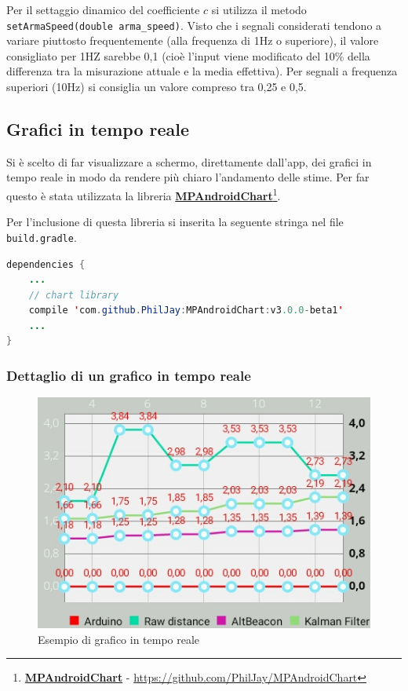 Per il settaggio dinamico del coefficiente $ c $ si utilizza il metodo \texttt{setArmaSpeed(double arma\_speed)}. Visto che i segnali considerati tendono a variare piuttosto frequentemente (alla frequenza di 1Hz o superiore), il valore consigliato per 1HZ sarebbe 0,1 (cioè l'input viene modificato del 10\% della differenza tra la misurazione attuale e la media effettiva). Per segnali a frequenza superiori (10Hz) si consiglia un valore compreso tra 0,25 e 0,5.

\subsection{Grafici in tempo reale}
Si è scelto di far visualizzare a schermo, direttamente dall'app, dei grafici in tempo reale in modo da rendere più chiaro l'andamento delle stime.
Per far questo è stata utilizzata la libreria \href{https://github.com/PhilJay/MPAndroidChart}{\textbf{MPAndroidChart}}\footnote{\href{https://github.com/PhilJay/MPAndroidChart}{\textbf{MPAndroidChart}} - \url{https://github.com/PhilJay/MPAndroidChart}}.

Per l'inclusione di questa libreria si inserita la seguente stringa nel file \texttt{build.gradle}.
\begin{lstlisting}[language=Java]
dependencies {
	...
	// chart library
	compile 'com.github.PhilJay:MPAndroidChart:v3.0.0-beta1'
	...
}
\end{lstlisting}

\subsubsection{Dettaglio di un grafico in tempo reale}
\begin{figure}[ph]
	\centering
	\includegraphics[width=0.6\linewidth]{img/app/chart1.jpg}
	\caption{Esempio di grafico in tempo reale}
	\label{fig:chart1}
\end{figure}



